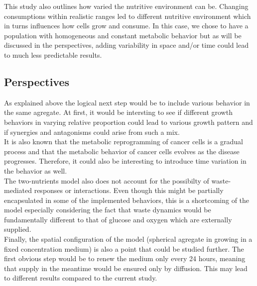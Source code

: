 \documentclass[11pt,a4paper]{article}
\begin{document}
This study also outlines how varied the nutritive environment can be. Changing consumptions within realistic ranges led to different nutritive environment which in turns influences how cells grow and consume. In this case, we chose to have a population with homogeneous and constant metabolic behavior but as will be discussed in the perspectives, adding variability in space and/or time could lead to much less predictable results.\\

\subsection{Perspectives}
As explained above the logical next step would be to include various behavior in the same agregate. At first, it would be intersting to see if different growth behaviors in varying relative proportion could lead to various growth pattern and if synergies and antagonisms could arise from such a mix.\\

It is also known that the metabolic reprogramming of cancer cells is a gradual process and that the metabolic behavior of cancer cells evolves as the disease progresses.\cite{Strickland2017}\cite{Compton2022} Therefore, it could also be interesting to introduce time variation in the behavior as well.\\

The two-nutrients model also does not account for the possibilty of waste-mediated responses or interactions. Even though this might be partially encapsulated in some of the implemented behaviors, this is a shortcoming of the model especially considering the fact that waste dynamics would be fundamentally different to that of glucose and oxygen which are externally supplied.\\

Finally, the spatial configuration of the model (spherical agregate in growing in a fixed concentration medium) is also a point that could be studied further. The first obvious step would be to renew the medium only every 24 hours, meaning that supply in the meantime would be ensured only by diffusion. This may lead to different results compared to the current study. 
\newpage


\end{document}
